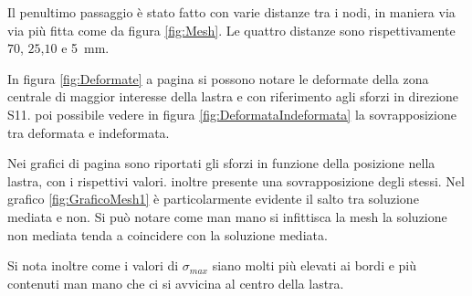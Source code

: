 Il penultimo passaggio è stato fatto con varie distanze tra i nodi, in maniera via via più fitta come da figura \ref{fig:Mesh}. Le quattro distanze sono rispettivamente $70$, $25$,$10$ e \SI{5}{\milli\metre}.

In figura \ref{fig:Deformate} a pagina \pageref{fig:Deformate} si possono notare le deformate della zona centrale di maggior interesse della lastra e con riferimento agli sforzi in direzione S11. 
\e poi possibile vedere in figura \ref{fig:DeformataIndeformata} la sovrapposizione tra deformata e indeformata.

Nei grafici di pagina \pageref{fig:Grafici} sono riportati gli sforzi in funzione della posizione nella lastra, con i rispettivi valori. 
\e inoltre presente una sovrapposizione degli stessi.
Nel grafico \ref{fig:GraficoMesh1} è particolarmente evidente il salto tra soluzione mediata e non. 
Si può notare come man mano si infittisca la mesh la soluzione non mediata tenda a coincidere con la soluzione mediata.

Si nota inoltre come i valori di $\sigma _{max}$ siano molti più elevati ai bordi e più contenuti man mano che ci si avvicina al centro della lastra. 

